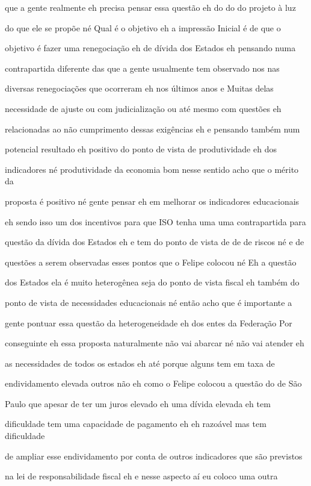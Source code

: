 \documentclass[a4paper,12pt]{article}
\begin{document}
que a gente realmente eh precisa pensar essa questão eh do do do projeto à luz

do que ele se propõe né Qual é o objetivo eh a impressão Inicial é de que o

objetivo é fazer uma renegociação eh de dívida dos Estados eh pensando numa

contrapartida diferente das que a gente usualmente tem observado nos nas

diversas renegociações que ocorreram eh nos últimos anos e Muitas delas

necessidade de ajuste ou com judicialização ou até mesmo com questões eh

relacionadas ao não cumprimento dessas exigências eh e pensando também num

potencial resultado eh positivo do ponto de vista de produtividade eh dos

indicadores né produtividade da economia bom nesse sentido acho que o mérito da

proposta é positivo né gente pensar eh em melhorar os indicadores educacionais

eh sendo isso um dos incentivos para que ISO tenha uma uma contrapartida para

questão da dívida dos Estados eh e tem do ponto de vista de de de riscos né e de

questões a serem observadas esses pontos que o Felipe colocou né Eh a questão

dos Estados ela é muito heterogênea seja do ponto de vista fiscal eh também do

ponto de vista de necessidades educacionais né então acho que é importante a

gente pontuar essa questão da heterogeneidade eh dos entes da Federação Por

conseguinte eh essa proposta naturalmente não vai abarcar né não vai atender eh

as necessidades de todos os estados eh até porque alguns tem em taxa de

endividamento elevada outros não eh como o Felipe colocou a questão do de São

Paulo que apesar de ter um juros elevado eh uma dívida elevada eh tem

dificuldade tem uma capacidade de pagamento eh eh razoável mas tem dificuldade

de ampliar esse endividamento por conta de outros indicadores que são previstos

na lei de responsabilidade fiscal eh e nesse aspecto aí eu coloco uma outra
\end{document}
